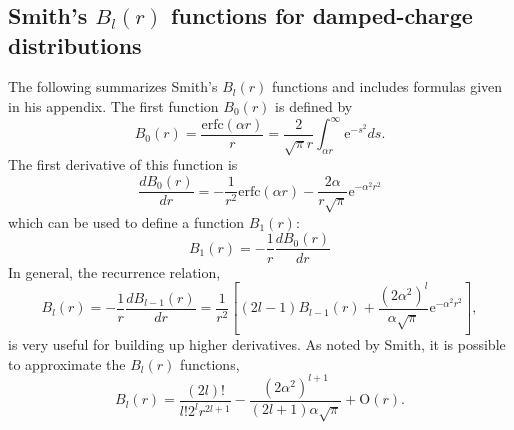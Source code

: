 %
%
%
%
%
%
%
%

%
%

\chapter{}

\section{Smith's $B_l(r)$ functions for damped-charge distributions}
\label{SmithFunc}
The following summarizes Smith's $B_l(r)$ functions and includes
formulas given in his appendix.\cite{Smith98} The first function
$B_0(r)$ is defined by
%
\begin{equation}
B_0(r)=\frac{\text{erfc}(\alpha r)}{r} = \frac{2}{\sqrt{\pi}r}
\int_{\alpha r}^{\infty} \text{e}^{-s^2} ds .
\end{equation}
%
The first derivative of this function is
%
\begin{equation}
\frac{dB_0(r)}{dr}=-\frac{1}{r^2}\text{erfc}(\alpha r)
-\frac{2\alpha}{r\sqrt{\pi}}\text{e}^{-{\alpha}^2r^2}
\end{equation}
%
which can be used to define a function $B_1(r)$:
%
\begin{equation}
B_1(r)=-\frac{1}{r}\frac{dB_0(r)}{dr}
\end{equation}
%
In general, the recurrence relation,
\begin{equation}
B_l(r)=-\frac{1}{r}\frac{dB_{l-1}(r)}{dr} 
= \frac{1}{r^2} \left[ (2l-1)B_{l-1}(r) + \frac {(2\alpha^2)^l}{\alpha \sqrt{\pi}}
\text{e}^{-{\alpha}^2r^2}
\right] ,
\end{equation}
is very useful for building up higher derivatives. As noted by Smith,
it is possible to approximate the $B_l(r)$ functions,
%
\begin{equation}
B_l(r)=\frac{(2l)!}{l!2^lr^{2l+1}} - \frac {(2\alpha^2)^{l+1}}{(2l+1)\alpha \sqrt{\pi}}
+\text{O}(r) .
\end{equation}

